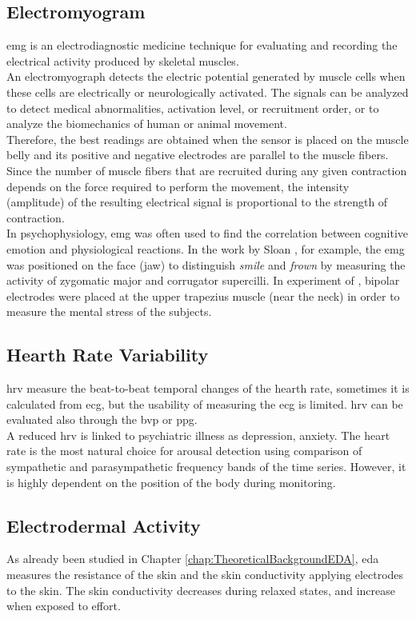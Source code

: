\subsection{Electromyogram}
\gls{emg} is an electrodiagnostic medicine technique for evaluating and recording the electrical activity produced by skeletal muscles.
\\
An electromyograph detects the electric potential generated by muscle cells when these cells are electrically or neurologically activated. The signals can be analyzed to detect medical abnormalities, activation level, or recruitment order, or to analyze the biomechanics of human or animal movement.
\\ \indent
Therefore, the best readings are obtained when the sensor is placed on the muscle belly and its positive and negative electrodes are parallel to the muscle fibers. Since the number of muscle fibers that are recruited during any given contraction depends on the force required to perform the movement, the intensity (amplitude) of the resulting electrical signal is proportional to the strength of contraction.
\\ \indent
In psychophysiology, \gls{emg} was often used to find the correlation between cognitive emotion and physiological reactions. In the work by Sloan \cite{sloan2004emotion}, for example, the \gls{emg} was positioned on the face (jaw) to distinguish \textit{smile} and \textit{frown} by measuring the activity of zygomatic major and corrugator supercilli. In experiment of \cite{kim2008emotion}, bipolar electrodes were placed at the upper trapezius muscle (near the neck) in order to measure the mental stress of the subjects.

\subsection{Hearth Rate Variability}
\gls{hrv} measure the beat-to-beat temporal changes of the hearth rate, sometimes it is calculated from \gls{ecg}, but the usability of measuring the \gls{ecg} is limited. \gls{hrv} can be evaluated also through the \gls{bvp} or \gls{ppg}.
\\ \indent
A reduced \gls{hrv} is linked to psychiatric illness as depression, anxiety. The heart rate is the most natural choice for arousal detection using comparison of sympathetic and parasympathetic frequency bands of the time series. However, it is highly dependent on the position of the body during monitoring.

\subsection{Electrodermal Activity}
As already been studied in Chapter \ref{chap:TheoreticalBackgroundEDA}, \gls{eda} measures the resistance of the skin and the skin conductivity applying electrodes to the skin. The skin conductivity decreases during relaxed states, and increase when exposed to effort.

